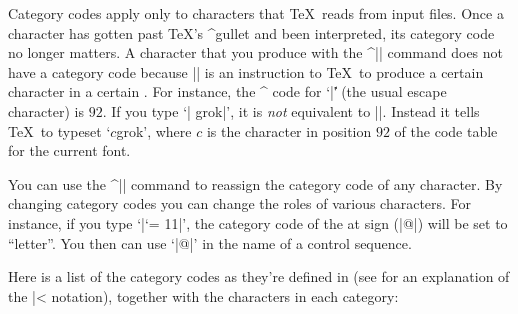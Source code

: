 Category codes apply only to characters that \TeX\ reads from input
files.  Once a character has gotten past \TeX's ^{gullet}
\seeconcept{\anatomy} and been interpreted, its category code no
longer matters.  A character that you produce with the ^|\char| command
\ctsref{\char} does not have a category code because |\char|
is an instruction to \TeX\ to produce a certain character in a certain
.  For instance, the ^{\ascii} code for `|\|'
(the usual escape character) is $92$.  If
you type `| grok|', it is \emph{not} equivalent to |\grok|.
Instead it tells \TeX\ to
typeset `$c$grok', where $c$ is the character in position $92$
of the code table for the current font.

You can use the ^|\catcode| command \ctsref{\catcode} to reassign the
category code of any character.  By changing category codes you can
change the roles of various characters.  For instance, if you type
`|\catcode`\@ = 11|', the category code of the at sign (|@|) will be set
to ``letter''.  You then can use `|@|' in the name of a control
sequence.

Here is a list of the category codes as they're defined in
 (see  for an explanation of
the |^^| notation),
together with the characters in each category:

